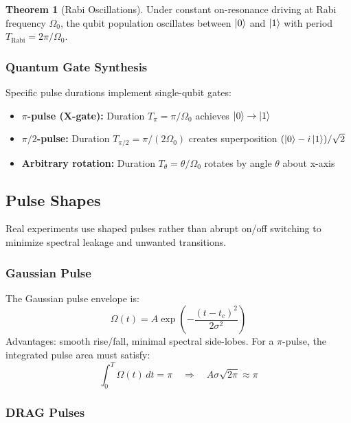\documentclass[11pt,a4paper]{article}
\theoremstyle{definition}
\newtheorem{theorem}{Theorem}[section]
\theoremstyle{remark}
\begin{document}
\begin{theorem}[Rabi Oscillations]
Under constant on-resonance driving at Rabi frequency $\Omega_0$, the qubit population oscillates between $\ket{0}$ and $\ket{1}$ with period $T_{\text{Rabi}} = 2\pi / \Omega_0$.
\end{theorem}

\subsubsection{Quantum Gate Synthesis}

Specific pulse durations implement single-qubit gates:

\begin{itemize}
    \item \textbf{$\pi$-pulse (X-gate):} Duration $T_\pi = \pi / \Omega_0$ achieves $\ket{0} \to \ket{1}$
    \item \textbf{$\pi/2$-pulse:} Duration $T_{\pi/2} = \pi / (2\Omega_0)$ creates superposition $({\ket{0} - i\ket{1}})/\sqrt{2}$
    \item \textbf{Arbitrary rotation:} Duration $T_\theta = \theta / \Omega_0$ rotates by angle $\theta$ about x-axis
\end{itemize}

\subsection{Pulse Shapes}

Real experiments use shaped pulses rather than abrupt on/off switching to minimize spectral leakage and unwanted transitions.

\subsubsection{Gaussian Pulse}

The Gaussian pulse envelope is:
\begin{equation}
\Omega(t) = A \exp\left(-\frac{(t - t_c)^2}{2\sigma^2}\right)
\end{equation}
Advantages: smooth rise/fall, minimal spectral side-lobes. For a $\pi$-pulse, the integrated pulse area must satisfy:
\begin{equation}
\int_0^T \Omega(t) \, dt = \pi \quad \Rightarrow \quad A \sigma \sqrt{2\pi} \approx \pi
\end{equation}

\subsubsection{DRAG Pulses}
\end{document}
